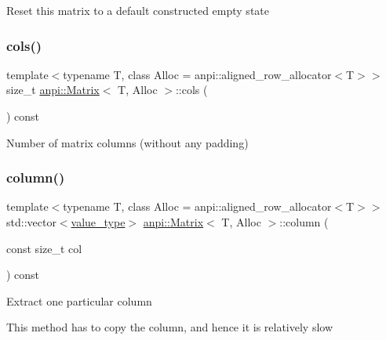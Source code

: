 Reset this matrix to a default constructed empty state \mbox{\label{classanpi_1_1Matrix_a42d956c83ca2f25dba6397b597410c54}} 
\subsubsection{\texorpdfstring{cols()}{cols()}}
{\footnotesize\ttfamily template$<$typename T, class Alloc = anpi\+::aligned\+\_\+row\+\_\+allocator$<$\+T$>$$>$ \\
size\+\_\+t \hyperlink{classanpi_1_1Matrix}{anpi\+::\+Matrix}$<$ T, Alloc $>$\+::cols (\begin{DoxyParamCaption}{ }\end{DoxyParamCaption}) const\hspace{0.3cm}{\ttfamily [inline]}}

Number of matrix columns (without any padding) \mbox{\label{classanpi_1_1Matrix_a322af2a78193e26ce71e64f271cdcbd3}} 
\subsubsection{\texorpdfstring{column()}{column()}}
{\footnotesize\ttfamily template$<$typename T, class Alloc = anpi\+::aligned\+\_\+row\+\_\+allocator$<$\+T$>$$>$ \\
std\+::vector$<$\hyperlink{classanpi_1_1Matrix_ad755076524c16fc494a392b0a66065cb}{value\+\_\+type}$>$ \hyperlink{classanpi_1_1Matrix}{anpi\+::\+Matrix}$<$ T, Alloc $>$\+::column (\begin{DoxyParamCaption}\item[{const size\+\_\+t}]{col }\end{DoxyParamCaption}) const\hspace{0.3cm}{\ttfamily [inline]}}

Extract one particular column

This method has to copy the column, and hence it is relatively slow \mbox{\label{classanpi_1_1Matrix_a237d42dce09484b8caa56307d0ff1870}} 
